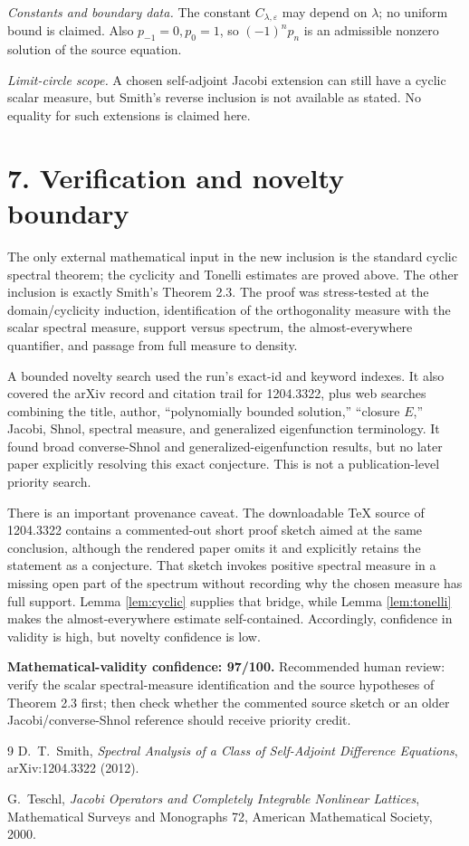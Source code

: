 \documentclass[11pt]{article}
\begin{document}
\emph{Constants and boundary data.}  The constant $C_{\lambda,\varepsilon}$ may depend on $\lambda$; no uniform bound is claimed.  Also $p_{-1}=0,p_0=1$, so $(-1)^np_n$ is an admissible nonzero solution of the source equation.

\emph{Limit-circle scope.}  A chosen self-adjoint Jacobi extension can still have a cyclic scalar measure, but Smith's reverse inclusion is not available as stated.  No equality for such extensions is claimed here.

\section*{7. Verification and novelty boundary}

The only external mathematical input in the new inclusion is the standard cyclic spectral theorem; the cyclicity and Tonelli estimates are proved above.  The other inclusion is exactly Smith's Theorem 2.3.  The proof was stress-tested at the domain/cyclicity induction, identification of the orthogonality measure with the scalar spectral measure, support versus spectrum, the almost-everywhere quantifier, and passage from full measure to density.

A bounded novelty search used the run's exact-id and keyword indexes.  It also covered the arXiv record and citation trail for 1204.3322, plus web searches combining the title, author, ``polynomially bounded solution,'' ``closure $E$,'' Jacobi, Shnol, spectral measure, and generalized eigenfunction terminology.  It found broad converse-Shnol and generalized-eigenfunction results, but no later paper explicitly resolving this exact conjecture.  This is not a publication-level priority search.

There is an important provenance caveat.  The downloadable TeX source of 1204.3322 contains a commented-out short proof sketch aimed at the same conclusion, although the rendered paper omits it and explicitly retains the statement as a conjecture.  That sketch invokes positive spectral measure in a missing open part of the spectrum without recording why the chosen measure has full support.  Lemma \ref{lem:cyclic} supplies that bridge, while Lemma \ref{lem:tonelli} makes the almost-everywhere estimate self-contained.  Accordingly, confidence in validity is high, but novelty confidence is low.

\textbf{Mathematical-validity confidence: 97/100.}  Recommended human review: verify the scalar spectral-measure identification and the source hypotheses of Theorem 2.3 first; then check whether the commented source sketch or an older Jacobi/converse-Shnol reference should receive priority credit.

\begin{thebibliography}{9}
D.~T.~Smith,
\emph{Spectral Analysis of a Class of Self-Adjoint Difference Equations},
arXiv:1204.3322 (2012).

G.~Teschl,
\emph{Jacobi Operators and Completely Integrable Nonlinear Lattices},
Mathematical Surveys and Monographs 72, American Mathematical Society, 2000.
\end{thebibliography}
\end{document}
